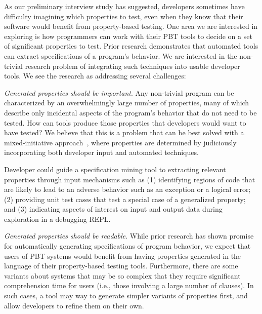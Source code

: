 
 

As our preliminary interview study has suggested, developers sometimes have difficulty imagining which properties to test, even when they know that their software would benefit from property-based testing. One area we are interested in exploring is how programmers can work with their PBT tools to decide on a set of significant properties to test.
Prior research demonstrates that automated tools can extract specifications of a program's behavior\cite{ammons2002mining,le2018deep,claessen2010quickspec}. We are interested in the non-trivial research problem of integrating such techniques into usable developer tools. We see the research as addressing several challenges:

\textit{Generated properties should be \emph{important}}. Any non-trivial program can be characterized by an overwhelmingly large number of properties, many of which describe only incidental aspects of the program's behavior that do not need to be tested. How can tools produce those properties that developers would want to have tested? We believe that this is a problem that can be best solved with a mixed-initiative approach~\cite{allen1999mixed}, where properties are determined by judiciously incorporating both developer input and automated techniques.

Developer could guide a specification mining tool to extracting relevant properties through input mechanisms such as (1) identifying regions of code that are likely to lead to an adverse behavior such as an exception or a logical error; (2) providing unit test cases that test a special case of a generalized property; and (3) indicating aspects of interest on input and output data during exploration in a debugging REPL.

\textit{Generated properties should be \emph{readable}}. While prior research has shown promise for automatically generating specifications of program behavior, we expect that users of PBT systems would benefit from having properties generated in the language of their property-based testing tools. Furthermore, there are some variants about systems that may be so complex that they require significant comprehension time for users (i.e., those involving a large number of clauses). In such cases, a tool may way to generate simpler variants of properties first, and allow developers to refine them on their own.

